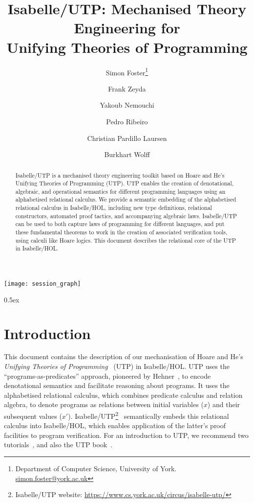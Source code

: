 \documentclass[11pt,a4paper]{article}
\begin{document}
\title{Isabelle/UTP: Mechanised Theory Engineering for \\ Unifying Theories of Programming}

\author{Simon Foster\footnote{Department of Computer Science, University of York. \href{mailto:simon.foster@york.ac.uk}{simon.foster@york.ac.uk}} \and Frank Zeyda \and Yakoub Nemouchi \and Pedro Ribeiro \and Christian Pardillo Laursen \and Burkhart Wolff}

\maketitle

\begin{abstract}
  Isabelle/UTP is a mechanised theory engineering toolkit based on Hoare and He's Unifying Theories of Programming
  (UTP). UTP enables the creation of denotational, algebraic, and operational semantics for different programming
  languages using an alphabetised relational calculus. We provide a semantic embedding of the alphabetised relational
  calculus in Isabelle/HOL, including new type definitions, relational constructors, automated proof tactics, and
  accompanying algebraic laws. Isabelle/UTP can be used to both capture laws of programming for different languages, and
  put these fundamental theorems to work in the creation of associated verification tools, using calculi like Hoare
  logics. This document describes the relational core of the UTP in Isabelle/HOL.
\end{abstract}

\tableofcontents

\begin{center}
  \texttt{[image: session\_graph]}
\end{center}

\parindent 0pt\parskip 0.5ex

\section{Introduction}

This document contains the description of our mechanisation of Hoare and He's \emph{Unifying Theories of
  Programming}~\cite{Hoare&98,Cavalcanti&06} (UTP) in Isabelle/HOL. UTP uses the ``programs-as-predicates'' approach, 
pioneered by Hehner~\cite{Hehner1988,Hehner1990,Hehner93}, to encode denotational semantics and facilitate reasoning about programs. 
It uses the alphabetised relational calculus, which combines predicate calculus and relation algebra, to denote programs as relations 
between initial variables ($x$) and their subsequent values ($x'$). Isabelle/UTP\footnote{Isabelle/UTP website:
  \url{https://www.cs.york.ac.uk/circus/isabelle-utp/}}~\cite{Foster16a,Foster16c,Foster14c} semantically embeds this
relational calculus into Isabelle/HOL, which enables application of the latter's proof facilities to program
verification. For an introduction to UTP, we recommend two tutorials~\cite{Cavalcanti04,Cavalcanti&06}, and also the UTP
book~\cite{Hoare&98}.
\end{document}
